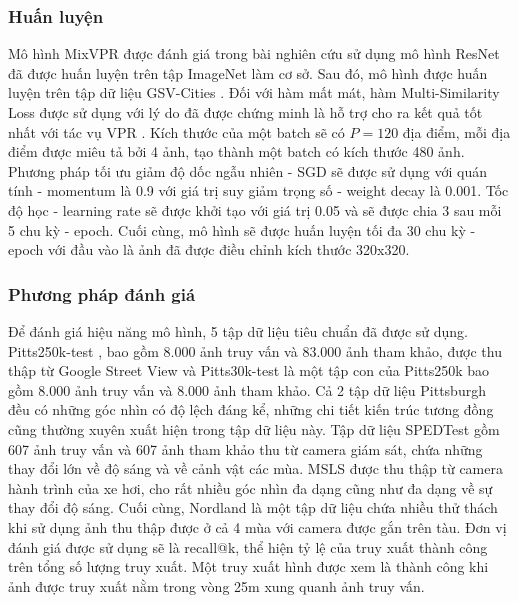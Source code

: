 \subsubsection{Huấn luyện}
Mô hình MixVPR được đánh giá trong bài nghiên cứu sử dụng mô hình ResNet \cite{he2016deep} đã được huấn luyện trên tập ImageNet \cite{krizhevsky2012imagenet} làm cơ sở. Sau đó, mô hình được huấn luyện trên tập dữ liệu GSV-Cities \cite{Ali_bey_2022}. Đối với hàm mất mát, hàm Multi-Similarity Loss \cite{wang2019multi} được sử dụng với lý do đã được chứng minh là hỗ trợ cho ra kết quả tốt nhất với tác vụ VPR \cite{Ali_bey_2022}. Kích thước của một batch sẽ có $P = 120$ địa điểm, mỗi địa điểm được miêu tả bởi 4 ảnh, tạo thành một batch có kích thước 480 ảnh. Phương pháp tối ưu giảm độ dốc ngẫu nhiên - SGD sẽ được sử dụng với quán tính - momentum là 0.9 với giá trị suy giảm trọng số - weight decay là 0.001. Tốc độ học - learning rate sẽ được khởi tạo với giá trị 0.05 và sẽ được chia 3 sau mỗi 5 chu kỳ - epoch. Cuối cùng, mô hình sẽ được huấn luyện tối đa 30 chu kỳ - epoch với đầu vào là ảnh đã được điều chỉnh kích thước 320x320.

\subsubsection{Phương pháp đánh giá}
Để đánh giá hiệu năng mô hình, 5 tập dữ liệu tiêu chuẩn đã được sử dụng. Pitts250k-test \cite{6618963}, bao gồm 8.000 ảnh truy vấn và 83.000 ảnh tham khảo, được thu thập từ Google Street View và Pitts30k-test \cite{6618963} là một tập con của Pitts250k bao gồm 8.000 ảnh truy vấn và 8.000 ảnh tham khảo. Cả 2 tập dữ liệu Pittsburgh đều có những góc nhìn có độ lệch đáng kể, những chi tiết kiến trúc tương đồng cũng thường xuyên xuất hiện trong tập dữ liệu này. Tập dữ liệu SPEDTest \cite{zaffar2021vpr} gồm 607 ảnh truy vấn và 607 ảnh tham khảo thu từ camera giám sát, chứa những thay đổi lớn về độ sáng và về cảnh vật các mùa. MSLS \cite{warburg2020mapillary} được thu thập từ camera hành trình của xe hơi, cho rất nhiều góc nhìn đa dạng cũng như đa dạng về sự thay đổi độ sáng. Cuối cùng, Nordland \cite{zaffar2021vpr} là một tập dữ liệu chứa nhiều thử thách khi sử dụng ảnh thu thập được ở cả 4 mùa với camera được gắn trên tàu. Đơn vị đánh giá được sử dụng sẽ là recall@k, thể hiện tỷ lệ của truy xuất thành công trên tổng số lượng truy xuất. Một truy xuất hình được xem là thành công khi ảnh được truy xuất nằm trong vòng 25m xung quanh ảnh truy vấn.

